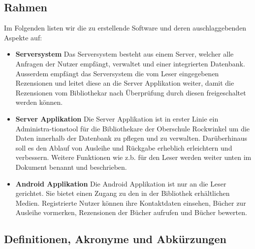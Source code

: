 \documentclass[fontsize=12pt,paper=a4,twoside]{scrartcl}
\begin{document}
\subsection{Rahmen}

Im Folgenden listen wir die zu erstellende Software und deren auschlaggebenden Aspekte auf:

\begin{itemize}

\item{\textbf{Serversystem}}
Das Serversystem besteht aus einem Server, welcher alle Anfragen der Nutzer empfängt, verwaltet und einer integrierten Datenbank. Ausserdem empfängt das Serversystem die vom Leser eingegebenen Rezensionen und leitet diese an die Server Applikation weiter, damit die Rezensionen vom Bibliothekar nach Überprüfung durch diesen freigeschaltet werden können.

\item{\textbf{Server Applikation}}
Die Server Applikation ist in erster Linie ein Administra-tionstool für die Bibliothekare der Oberschule Rockwinkel um die Daten innerhalb der Datenbank zu pflegen und zu verwalten. Darüberhinaus soll es den Ablauf von Ausleihe und Rückgabe erheblich erleichtern und verbessern. Weitere Funktionen wie z.b. für den Leser werden weiter unten im Dokument benannt und beschrieben.

\item{\textbf{Android Applikation}}
Die Android Applikation ist nur an die Leser gerichtet. Sie bietet einen Zugang zu den in der Bibliothek erhältlichen Medien. Registrierte Nutzer können ihre Kontaktdaten einsehen, Bücher zur Ausleihe vormerken, Rezensionen der Bücher aufrufen und Bücher bewerten.
\end{itemize}

\subsection{Definitionen, Akronyme und Abkürzungen}
\end{document}
